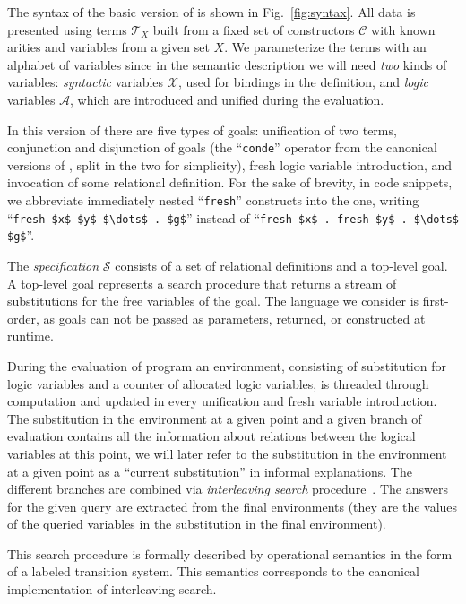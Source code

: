 The syntax of the basic version of \mK is shown in Fig.~\ref{fig:syntax}. 
All data is presented using terms $\mathcal{T}_X$ built from a fixed set of constructors $\mathcal{C}$ with known arities and variables
from a given set $X$.
We parameterize the terms with an alphabet of variables since in the semantic description we will need \emph{two} kinds of variables:
\emph{syntactic} variables $\mathcal{X}$, used for bindings in the definition, and \emph{logic} variables $\mathcal{A}$, which are
introduced and unified during the evaluation.

In this version of \mK there are five types of goals: unification of two terms, conjunction and disjunction of goals (the
``\lstinline|conde|'' operator from the canonical versions of \mK, split in the two for simplicity), fresh logic variable introduction, and
invocation of some relational definition. For the sake of brevity, in code snippets, we abbreviate immediately nested ``\lstinline|fresh|''
constructs into the one, writing ``\lstinline|fresh $x$ $y$ $\dots$ . $g$|'' instead of
``\lstinline|fresh $x$ . fresh $y$ . $\dots$ $g$|''.

The \emph{specification} $\mathcal{S}$ consists of a set of relational definitions and a top-level goal.
A top-level goal represents a search procedure that returns a stream of substitutions for the free variables of the goal.
The language we consider is first-order, as goals can not be passed as parameters, returned, or constructed at runtime.

During the evaluation of \mK program an environment, consisting of substitution for logic variables and a counter of allocated logic
variables, is threaded through computation and updated in every unification and fresh variable introduction.
The substitution in the environment at a given point and a given branch of evaluation contains all the information about relations between
the logical variables at this point, we will later refer to the substitution in the environment at a given point as a ``current substitution''
in informal explanations.
The different branches are combined via \emph{interleaving search} procedure~\cite{InterleavingSearch}.
The answers for the given query are extracted from the final environments (they are the values of the queried variables in the substitution
in the final environment).

This search procedure is formally described by operational semantics in the form of a labeled transition system.
This semantics corresponds to the canonical implementation of interleaving search. 

